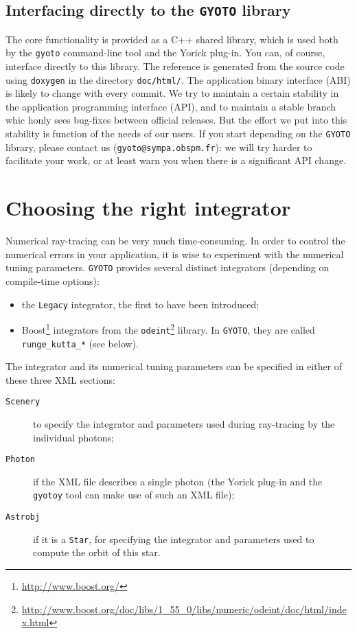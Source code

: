 \documentclass[a4paper,12pt]{article}
\begin{document}
\subsection{Interfacing directly to the \texttt{GYOTO} library}

The core functionality is provided as a C++ shared library, which is
used both by the \texttt{gyoto} command-line tool and the Yorick
plug-in. You can, of course, interface directly to this library. The
reference is generated from the source code using \texttt{doxygen} in
the directory \texttt{doc/html/}. The application binary interface
(ABI) is likely to change with every commit. We try to maintain a
certain stability in the application programming interface (API), and
to maintain a stable branch whic honly sees bug-fixes between official
releases. But the effort we put into this stability is function of the
needs of our users. If you start depending on the \texttt{GYOTO}
library, please contact us (\texttt{gyoto@sympa.obspm.fr}): we will
try harder to facilitate your work, or at least warn you when there is
a significant API change.

\section{Choosing the right integrator}
\label{tuning}

Numerical ray-tracing can be very much time-consuming. In order to
control the numerical errors in your application, it is wise to
experiment with the numerical tuning parameters. \texttt{GYOTO}
provides several distinct integrators (depending on compile-time
options):
\begin{itemize}
\item the \texttt{Legacy} integrator, the first to have been introduced;
\item Boost\footnote{\url{http://www.boost.org/}} integrators from the
  \texttt{odeint}\footnote{\url{http://www.boost.org/doc/libs/1_55_0/libs/numeric/odeint/doc/html/index.html}}
  library. In \texttt{GYOTO}, they are called
  \texttt{runge\_kutta\_*} (see below).
\end{itemize}

The integrator and its numerical tuning parameters can be specified in
either of these three XML sections:
\begin{description}
\item[\texttt{Scenery}] to specify the integrator and parameters used
  during ray-tracing by the individual photons;
\item[\texttt{Photon}] if the XML file describes a single photon (the
  Yorick plug-in and the \texttt{gyotoy} tool can make use of such an
  XML file);
\item[\texttt{Astrobj}] if it is a \texttt{Star}, for specifying the
  integrator and parameters used to compute the orbit of this star.
\end{description}
\end{document}
